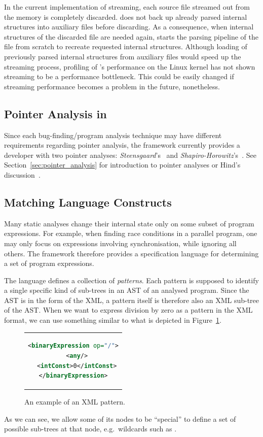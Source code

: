 In the current implementation of streaming, each source file streamed out from
the memory is completely discarded. \stan does not back up already parsed
internal structures into auxiliary files before discarding. As a consequence,
when internal structures of the discarded file are needed again, \stan starts
the parsing pipeline of the file from scratch to recreate requested internal
structures. Although loading of previously parsed internal structures from
auxiliary files would speed up the streaming process, profiling of \stan's
performance on the Linux kernel has not shown streaming to be a performance
bottleneck. This could be easily changed if streaming performance becomes a
problem in the future, nonetheless.


\subsection*{Pointer Analysis in \stan}

Since each bug-finding/program analysis technique may have different
requirements regarding pointer analysis, the \stan framework currently
provides a developer with two pointer analyses:
\textit{Steensgaard}'s~\cite{steensgaard} and
\textit{Shapiro-Horowitz}'s~\cite{shapiro_horwitz}. See
Section~\ref{sec:pointer_analysis} for introduction to pointer analyses or
Hind's discussion~\cite{ptr_solved}.

\subsection*{Matching Language Constructs}

Many static analyses change their internal state only on some subset of
program expressions. For example, when finding race conditions in a
parallel program, one may only focus on expressions involving synchronisation,
while ignoring all others. The \stan framework therefore provides a
specification language for determining a set of program expressions.

The language defines a collection of \emph{patterns}. Each pattern is supposed
to identify a single specific kind of sub-trees in an AST of an analysed
program. Since the AST is in the form of the XML, a pattern itself is
therefore also an XML sub-tree of the AST. When we want to express division by
zero as a pattern in the XML format, we can use something similar to what is
depicted in Figure~\ref{fig:stan_div0}.
\begin{figure}[htb]
\begin{center}
\begin{tabular}{c}
\begin{lstlisting}[language=XML]
<binaryExpression op="/">
  <any/>
  <intConst>0</intConst>
</binaryExpression>
\end{lstlisting}
\end{tabular}
\end{center}
  \caption{An example of an XML pattern.}
  \label{fig:stan_div0}
\end{figure}
As we can see, we allow some of its nodes to be ``special'' to
define a set of possible sub-trees at that node, e.g.\ wildcards such as
.


